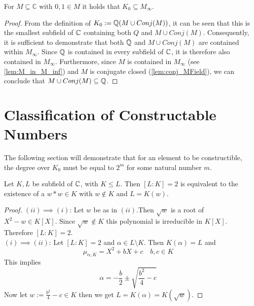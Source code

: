 \begin{lemma}
    \label{lem:K_zero_in_MField}
    \leanok
    For $M\subseteq \mathbb{C}$ with $0,1 \in M$ it holds that $K_0 \subseteq M_{\infty}$.
\end{lemma}
\begin{proof}
    \leanok
From the definition of $K_0 := \mathbb{Q}(M\cup Conj(M))$, 
it can be seen that this is the smallest subfield of $\mathbb{C}$ containing both $Q$ and $M\cup Conj(M)$. 
Consequently, it is sufficient to demonstrate that both $\mathbb{Q}$ and $M\cup Conj(M)$ are contained within $M_{\infty}$. 
Since $\mathbb{Q}$ is contained in every subfield of $\mathbb{C}$, it is therefore also contained in $M_{\infty}$. 
Furthermore, since $M$ is contained in $M_{\infty}$ (see \ref{lem:M_in_M_inf}) and $M$ is conjugate closed (\ref{lem:conj_MField}), we can conclude that $M\cup Conj(M) \subseteq \mathbb{Q}$.
\end{proof}

\section{Classification of Constructable Numbers}
The following section will demonstrate that for an element to be constructible, the degree over $K_0$ must be equal to $2^m$ for some natural number $m$.

\begin{lemma}
    \label{lem:dergree_two_eq_sqr}
    \leanok
    Let $K, L$ be subfield of $\mathbb{C}$, with $K\le L$. Then $[L:K] = 2$ is equivalent to the existence of a $w*w \in K$ with $w \notin K$ and $L = K(w)$.
\end{lemma}
\begin{proof}
    $(ii)\implies (i)$: Let $w$ be as in $(ii)$.Then $\sqrt{w}$ is a root of $X^2 - w \in K[X]$. Since $\sqrt{w} \notin K$ this polynomial is irreducible in $K[X]$. Therefore $[L:K] = 2$.\\
    $(i)\implies (ii)$: Let $[L:K] = 2$ and $\alpha \in L \setminus K$. Then $K(\alpha) = L$ and 
    $$\mu_{\alpha, K}=X^2 + bX + c \quad b,c \in K$$
    This implies 
    $$\alpha = -\frac{b}{2} \pm \sqrt{\frac{b^2}{4} - c} $$
    Now let $w := \frac{b^2}{4} - c \in K$ then we get $L = K(\alpha) = K(\sqrt{w})$.
\end{proof}


